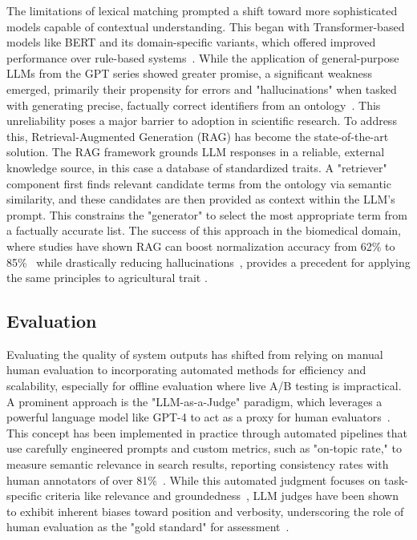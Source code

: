 \documentclass[journal]{./IEEE/IEEEtran}
\begin{document}
The limitations of lexical matching prompted a shift toward more sophisticated models capable of contextual understanding. This began with Transformer-based models like BERT and its domain-specific variants, which offered improved performance over rule-based systems~\cite{yang_enhancing_2024}. While the application of general-purpose LLMs from the GPT series showed greater promise, a significant weakness emerged, primarily their propensity for errors and "hallucinations" when tasked with generating precise, factually correct identifiers from an ontology~\cite{garcia_improving_2025, soong_improving_2024}. This unreliability poses a major barrier to adoption in scientific research. To address this, Retrieval-Augmented Generation (RAG) has become the state-of-the-art solution. The RAG framework grounds LLM responses in a reliable, external knowledge source, in this case a database of standardized traits. A "retriever" component first finds relevant candidate terms from the ontology via semantic similarity, and these candidates are then provided as context within the LLM's prompt. This constrains the "generator" to select the most appropriate term from a factually accurate list. The success of this approach in the biomedical domain, where studies have shown RAG can boost normalization accuracy from 62\% to 85\%~\cite{hier_simplified_2025} while drastically reducing hallucinations~\cite{garcia_improving_2025}, provides a precedent for applying the same principles to agricultural trait .

\subsection{Evaluation}
Evaluating the quality of system outputs has shifted from relying on manual human evaluation to incorporating automated methods for efficiency and scalability, especially for offline evaluation where live A/B testing is impractical. A prominent approach is the "LLM-as-a-Judge" paradigm, which leverages a powerful language model like GPT-4 to act as a proxy for human evaluators~\cite{zheng_judging_2023}. This concept has been implemented in practice through automated pipelines that use carefully engineered prompts and custom metrics, such as "on-topic rate," to measure semantic relevance in search results, reporting consistency rates with human annotators of over 81\%~\cite{zheng_semantic_2024}. While this automated judgment focuses on task-specific criteria like relevance and groundedness~\cite{balaguer_rag_2024}, LLM judges have been shown to exhibit inherent biases toward position and verbosity, underscoring the role of human evaluation as the "gold standard" for assessment~\cite{zheng_judging_2023}.
\end{document}
